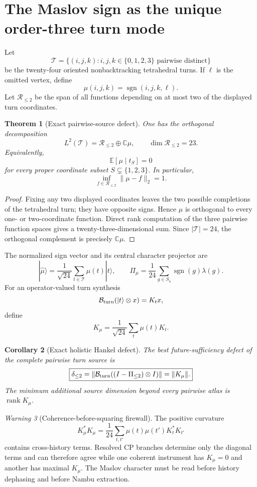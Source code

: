 \documentclass[11pt,oneside,openany]{book}
\numberwithin{equation}{chapter}
\newtheorem{theorem}{Theorem}[chapter]
\newtheorem{corollary}[theorem]{Corollary}
\theoremstyle{definition}
\theoremstyle{remark}
\newtheorem{warning}[theorem]{Warning}
\newcommand{\C}{\mathbb C}
\newcommand{\rank}{\operatorname{rank}}
\newcommand{\sgn}{\operatorname{sgn}}
\begin{document}
\section{The Maslov sign as the unique order-three turn mode}
\label{sec:v5-maslov-order-three}

Let
\[
 \mathcal T
 =\{(i,j,k):i,j,k\in\{0,1,2,3\}\text{ pairwise distinct}\}
\]
be the twenty-four oriented nonbacktracking tetrahedral turns.  If \(\ell\)
is the omitted vertex, define
\[
 \mu(i,j,k)=\sgn(i,j,k,\ell).
\]
Let \(\mathcal R_{\le2}\) be the span of all functions depending on at most
two of the displayed turn coordinates.

\begin{theorem}[Exact pairwise-source defect]
\label{thm:v5-pairwise-defect}
One has the orthogonal decomposition
\[
 \boxed{L^2(\mathcal T)=\mathcal R_{\le2}\oplus\C\mu,\qquad
 \dim\mathcal R_{\le2}=23.}
\]
Equivalently,
\[
 \mathbb E[\mu\mid t_S]=0
\]
for every proper coordinate subset \(S\subsetneq\{1,2,3\}\).  In particular,
\[
 \inf_{f\in\mathcal R_{\le2}}\|\mu-f\|_2=1.
\]
\end{theorem}

\begin{proof}
Fixing any two displayed coordinates leaves the two possible completions of
the tetrahedral turn; they have opposite signs.  Hence \(\mu\) is orthogonal
to every one- or two-coordinate function.  Direct rank computation of the
three pairwise function spaces gives a twenty-three-dimensional sum.  Since
\(|\mathcal T|=24\), the orthogonal complement is precisely \(\C\mu\).
\end{proof}

The normalized sign vector and its central character projector are
\[
 |\widehat\mu\rangle
 =\frac1{\sqrt{24}}\sum_{t\in\mathcal T}\mu(t)|t\rangle,
 \qquad
 \Pi_\mu
 =\frac1{24}\sum_{g\in S_4}\sgn(g)\lambda(g).
\]
For an operator-valued turn synthesis
\[
 \mathcal B_{\rm turn}(|t\rangle\otimes x)=K_tx,
\]
define
\[
 \boxed{K_\mu=\frac1{\sqrt{24}}\sum_t\mu(t)K_t.}
\]

\begin{corollary}[Exact holistic Hankel defect]
\label{cor:v5-holistic-defect}
The best future-sufficiency defect of the complete pairwise turn source is
\[
 \boxed{
 \delta_{\le2}
 =\|\mathcal B_{\rm turn}((I-\Pi_{\le2})\otimes I)\|
 =\|K_\mu\|.}
\]
The minimum additional source dimension beyond every pairwise atlas is
\(\rank K_\mu\).
\end{corollary}

\begin{warning}[Coherence-before-squaring firewall]
The positive curvature
\[
 K_\mu^*K_\mu
 =\frac1{24}\sum_{t,t'}\mu(t)\mu(t')K_t^*K_{t'}
\]
contains cross-history terms.  Resolved CP branches determine only the
diagonal terms and can therefore agree while one coherent instrument has
\(K_\mu=0\) and another has maximal \(K_\mu\).  The Maslov character must be
read before history dephasing and before Nambu extraction.
\end{warning}
\end{document}
